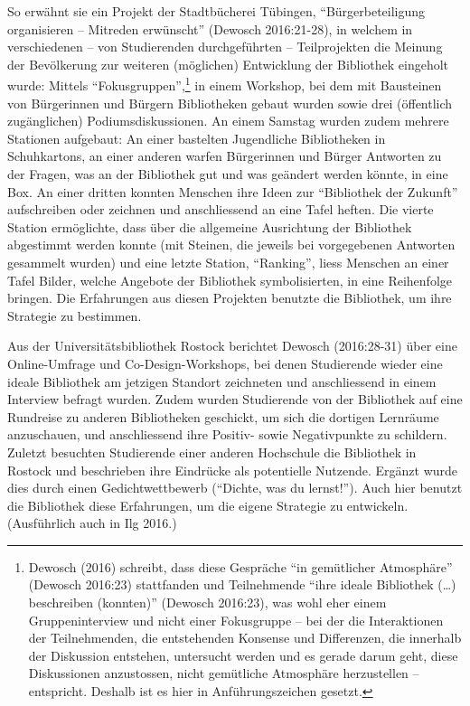 \documentclass[a4paper,
fontsize=11pt,
oneside,
numbers=noperiodatend,
parskip=half-,
bibliography=totoc,
final
]{scrartcl}
\begin{document}
So erwähnt sie ein Projekt der Stadtbücherei Tübingen,
\enquote{Bürgerbeteiligung organisieren -- Mitreden erwünscht} (Dewosch
2016:21-28), in welchem in verschiedenen -- von Studierenden
durchgeführten -- Teilprojekten die Meinung der Bevölkerung zur weiteren
(möglichen) Entwicklung der Bibliothek eingeholt wurde: Mittels
\enquote{Fokusgruppen},\footnote{Dewosch (2016) schreibt, dass diese
  Gespräche \enquote{in gemütlicher Atmosphäre} (Dewosch 2016:23)
  stattfanden und Teilnehmende \enquote{ihre ideale Bibliothek
  (\ldots{}) beschreiben (konnten)} (Dewosch 2016:23), was wohl eher
  einem Gruppeninterview und nicht einer Fokusgruppe -- bei der die
  Interaktionen der Teilnehmenden, die entstehenden Konsense und
  Differenzen, die innerhalb der Diskussion entstehen, untersucht werden
  und es gerade darum geht, diese Diskussionen anzustossen, nicht
  gemütliche Atmosphäre herzustellen -- entspricht. Deshalb ist es hier
  in Anführungszeichen gesetzt.} in einem Workshop, bei dem mit
Bausteinen von Bürgerinnen und Bürgern Bibliotheken gebaut wurden sowie
drei (öffentlich zugänglichen) Podiumsdiskussionen. An einem Samstag
wurden zudem mehrere Stationen aufgebaut: An einer bastelten Jugendliche
Bibliotheken in Schuhkartons, an einer anderen warfen Bürgerinnen und
Bürger Antworten zu der Fragen, was an der Bibliothek gut und was
geändert werden könnte, in eine Box. An einer dritten konnten Menschen
ihre Ideen zur \enquote{Bibliothek der Zukunft} aufschreiben oder
zeichnen und anschliessend an eine Tafel heften. Die vierte Station
ermöglichte, dass über die allgemeine Ausrichtung der Bibliothek
abgestimmt werden konnte (mit Steinen, die jeweils bei vorgegebenen
Antworten gesammelt wurden) und eine letzte Station, \enquote{Ranking},
liess Menschen an einer Tafel Bilder, welche Angebote der Bibliothek
symbolisierten, in eine Reihenfolge bringen. Die Erfahrungen aus diesen
Projekten benutzte die Bibliothek, um ihre Strategie zu bestimmen.

Aus der Universitätsbibliothek Rostock berichtet Dewosch (2016:28-31)
über eine Online-Umfrage und Co-Design-Workshops, bei denen Studierende
wieder eine ideale Bibliothek am jetzigen Standort zeichneten und
anschliessend in einem Interview befragt wurden. Zudem wurden
Studierende von der Bibliothek auf eine Rundreise zu anderen
Bibliotheken geschickt, um sich die dortigen Lernräume anzuschauen, und
anschliessend ihre Positiv- sowie Negativpunkte zu schildern. Zuletzt
besuchten Studierende einer anderen Hochschule die Bibliothek in Rostock
und beschrieben ihre Eindrücke als potentielle Nutzende. Ergänzt wurde
dies durch einen Gedichtwettbewerb (\enquote{Dichte, was du lernst!}).
Auch hier benutzt die Bibliothek diese Erfahrungen, um die eigene
Strategie zu entwickeln. (Ausführlich auch in Ilg 2016.)
\end{document}
